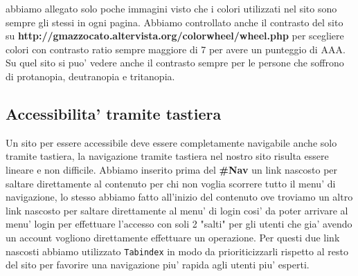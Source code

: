 abbiamo allegato solo poche immagini visto che i colori utilizzati nel sito sono sempre gli stessi in ogni pagina.\newline
Abbiamo controllato anche il contrasto del sito su \newline \textbf{http://gmazzocato.altervista.org/colorwheel/wheel.php} per scegliere colori con contrasto ratio sempre maggiore di 7 per avere un punteggio di AAA. Su quel sito si puo' vedere anche il contrasto sempre per le persone che soffrono di protanopia, deutranopia e tritanopia.

\subsection{Accessibilita' tramite tastiera}
Un sito per essere accessibile deve essere completamente navigabile anche solo tramite tastiera, la navigazione tramite tastiera nel nostro sito risulta essere lineare e non difficile. Abbiamo inserito prima del \textbf{\#Nav} un link nascosto per saltare direttamente al contenuto per chi non voglia scorrere tutto il menu' di navigazione, lo stesso abbiamo fatto all'inizio del contenuto ove troviamo un altro link nascosto per saltare direttamente al menu' di login cosi' da poter arrivare al menu' login per effettuare l'accesso con soli 2 "salti" per gli utenti che gia' avendo un account vogliono direttamente effettuare un operazione.
Per questi due link nascosti abbiamo utilizzato \texttt{Tabindex} in modo da prioriticizzarli rispetto al resto del sito per favorire una navigazione piu' rapida agli utenti piu' esperti. 
